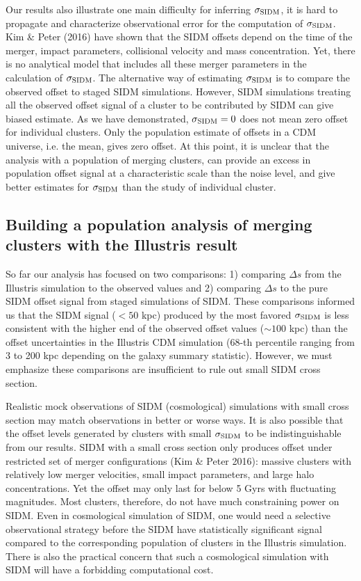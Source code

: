 Our results also illustrate one main difficulty for inferring $\sigma_{\rm
SIDM}$, it is hard to propagate and characterize observational error  
for the computation of $\sigma_{\rm SIDM}$. Kim \& Peter (2016) have shown 
that the SIDM offsets depend on the time of the 
merger, impact parameters, collisional velocity and mass concentration. 
Yet, there is no analytical model that includes all these merger
parameters in the calculation of $\sigma_{\rm SIDM}$.  
The alternative way of estimating $\sigma_{\rm SIDM}$ is to compare the observed
offset to staged SIDM simulations.
However, SIDM simulations treating all the observed offset signal of a cluster 
to be contributed by SIDM can give biased estimate.  
As we have demonstrated, $\sigma_{\rm SIDM} = 0$ does not mean zero offset for
individual clusters.  
Only the population estimate of offsets in a CDM universe, i.e. the mean,
gives zero offset.  
At this point, it is unclear that the analysis with a population of
merging clusters, can provide an excess in population offset signal at a
characteristic scale than the noise level, and give 
better estimates for $\sigma_{\rm
SIDM}$ than the study of individual cluster.  


\subsection{Building a population analysis of merging clusters with the Illustris result} 
\label{subsec:limitation_of_pvalue}
  
So far our analysis has focused on two comparisons: 1) comparing $\Delta s$ from
the Illustris simulation to the observed values and 2) comparing $\Delta s$ to  
the pure SIDM offset signal from staged simulations of SIDM. 
These comparisons informed us that the SIDM signal ($< 50$ kpc) produced by the most favored
$\sigma_{\rm SIDM}$ is less consistent with the higher end of the observed offset values ($\sim
100$ kpc) than the offset uncertainties in the Illustris CDM simulation (68-th 
percentile ranging from 3 to 200 kpc depending on the galaxy summary statistic).
However, we must emphasize these comparisons are
insufficient to rule out small SIDM cross section.  

Realistic mock observations of SIDM (cosmological) simulations 
with small cross section may match observations in better or worse ways. 
It is also possible that the offset levels generated by clusters with small $\sigma_{\rm SIDM}$ 
to be indistinguishable from our results. 
SIDM with a small cross section only produces offset under restricted set of 
merger configurations (Kim \& Peter 2016): 
massive clusters with relatively low merger velocities, small impact
parameters, and large halo concentrations. Yet the offset may only last
for below 5 Gyrs with fluctuating magnitudes.  
Most clusters, therefore, do not have much constraining power on SIDM.
Even in cosmological simulation of SIDM, one would need a selective observational strategy
before the SIDM have statistically significant signal compared 
to the corresponding population of clusters in the Illustris simulation.
There is also the practical concern that such a cosmological simulation with SIDM 
will have a forbidding computational cost.
 
